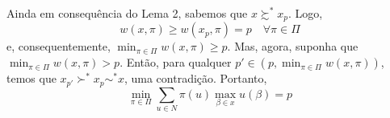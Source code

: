 \documentclass[11pt, a4paper]{article}
\theoremstyle{nonumberplain}
\theoremstyle{plain}
\theoremstyle{plain}
\begin{document}
Ainda em consequência do Lema 2, sabemos que $x\succsim^* x_p$. Logo, $$w(x,\pi)\geq w(x_p,\pi)=p\quad\forall\pi \in \Pi$$ e, consequentemente, $\min_{\pi\in\Pi}w(x,\pi)\geq p$. Mas, agora, suponha que $\min_{\pi\in\Pi}w(x,\pi)> p$. Então, para qualquer $p'\in (p,\min_{\pi\in\Pi}w(x,\pi))$, temos que $x_{p'}\succ^* x_p\sim^* x$, uma contradição. Portanto, $$\min_{\pi\in\Pi}\sum_{u\in N} \pi(u)\max_{\beta\in x}u(\beta)=p$$   
\end{document}
